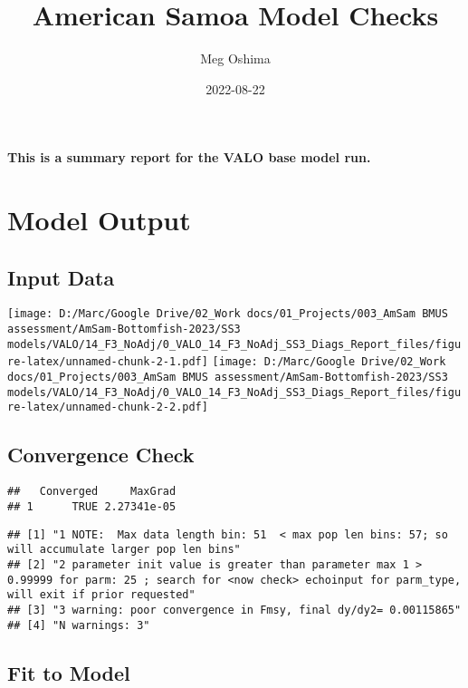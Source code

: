 \documentclass[
]{article}
\title{American Samoa Model Checks}
\author{Meg Oshima}
\date{2022-08-22}
\begin{document}
\maketitle

\textbf{This is a summary report for the VALO base model run.}

\hypertarget{model-output}{%
\section{Model Output}\label{model-output}}

\hypertarget{input-data}{%
\subsection{Input Data}\label{input-data}}

\texttt{[image: D:/Marc/Google Drive/02\_Work docs/01\_Projects/003\_AmSam BMUS assessment/AmSam-Bottomfish-2023/SS3 models/VALO/14\_F3\_NoAdj/0\_VALO\_14\_F3\_NoAdj\_SS3\_Diags\_Report\_files/figure-latex/unnamed-chunk-2-1.pdf]}
\texttt{[image: D:/Marc/Google Drive/02\_Work docs/01\_Projects/003\_AmSam BMUS assessment/AmSam-Bottomfish-2023/SS3 models/VALO/14\_F3\_NoAdj/0\_VALO\_14\_F3\_NoAdj\_SS3\_Diags\_Report\_files/figure-latex/unnamed-chunk-2-2.pdf]}

\hypertarget{convergence-check}{%
\subsection{Convergence Check}\label{convergence-check}}

\begin{verbatim}
##   Converged     MaxGrad
## 1      TRUE 2.27341e-05
\end{verbatim}

\begin{verbatim}
## [1] "1 NOTE:  Max data length bin: 51  < max pop len bins: 57; so will accumulate larger pop len bins"                                                            
## [2] "2 parameter init value is greater than parameter max 1 > 0.99999 for parm: 25 ; search for <now check> echoinput for parm_type, will exit if prior requested"
## [3] "3 warning: poor convergence in Fmsy, final dy/dy2= 0.00115865"                                                                                               
## [4] "N warnings: 3"
\end{verbatim}

\hypertarget{fit-to-model}{%
\subsection{Fit to Model}\label{fit-to-model}}
\end{document}
